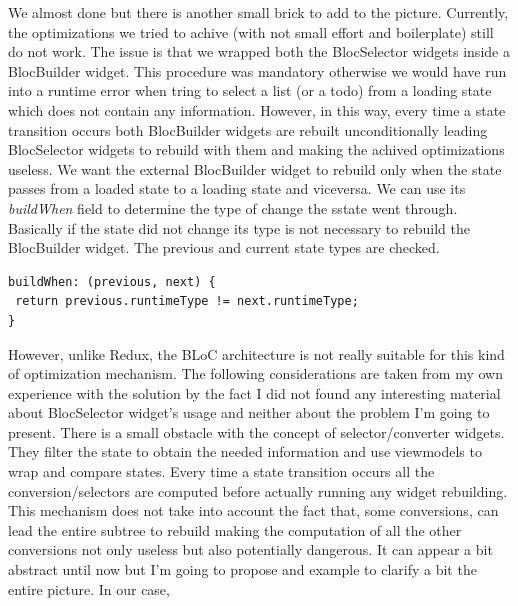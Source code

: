 We almost done but there is another small brick to add to the picture. Currently, the optimizations we tried to achive (with not small effort and boilerplate) still do not work. The issue is that we wrapped both the BlocSelector widgets inside a BlocBuilder widget. This procedure was mandatory otherwise we would have run into a runtime error when tring to select a list (or a todo) from a loading state which does not contain any information. However, in this way, every time a state transition occurs both BlocBuilder widgets are rebuilt unconditionally leading BlocSelector widgets to rebuild with them and making the achived optimizations useless. We want the external BlocBuilder widget to rebuild only when the state passes from a loaded state to a loading state and viceversa. We can use its \textit{buildWhen} field to determine the type of change the sstate went through. Basically if the state did not change its type is not necessary to rebuild the BlocBuilder widget. The previous and current state types are checked.

   
\begin{code}
 \mbox{}
\label{code:2.14}
\begin{verbatim}
buildWhen: (previous, next) {
 return previous.runtimeType != next.runtimeType;
}
\end{verbatim}
\mbox{}
\end{code}


 However, unlike Redux, the BLoC architecture is not really suitable for this kind of optimization mechanism. The following considerations are taken from my own experience with the solution by the fact I did not found any interesting material about BlocSelector widget's usage and neither about the problem I'm going to present. There is a small obstacle with the concept of selector/converter widgets. They filter the state to obtain the needed information and use viewmodels to wrap and compare states. Every time a state transition occurs all the conversion/selectors are computed before actually running any widget rebuilding. This mechanism does not take into account the fact that, some conversions, can lead the entire subtree to rebuild making the computation of all the other conversions not only useless but also potentially dangerous. It can appear a bit abstract until now but I'm going to propose and example to clarify a bit the entire picture. In our case, 

